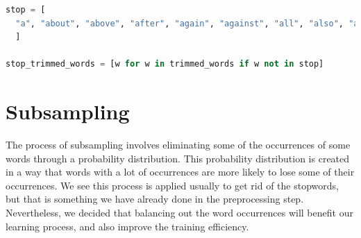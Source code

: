 \begin{lstlisting}[language=Python, caption=Stopword Removal]
stop = [
  "a", "about", "above", "after", "again", "against", "all", "also", "altough", "am", "an", "and", "any", "are", "aren't", "as", "at", "b", "be", "because", "been", "before", "being", "below", "between", "both", "but", "by", "c", "can", "can't", "cannot", "could", "couldn't", "d", "de", "did", "didn't", "do", "does", "doesn't", "doing", "don't", "down", "during", "e", "each", "either", "even", "f", "few", "for", "from", "further", "g", "h", "had", "hadn't", "has", "hasn't", "have", "haven't", "having", "he", "he'd", "he'll", "he's", "her", "here", "here's", "hers", "herself", "him", "himself", "his", "how", "how's", "however", "i", "i'd", "i'll", "i'm", "i've", "if", "ii", "in", "into", "is", "isn't", "it", "it's", "its", "itself", "j", "just", "k", "l", "like", "m", "many", "may", "me", "more", "most", "much", "must", "my", "myself", "n", "nd", "neither", "no", "nor", "not", "now", "o", "of", "off", "on", "once", "only", "or", "other", "our", "ours", "ourselves", "out", "over", "own", "p", "q", "r", "rd", "s", "same", "shall", "she", "she'd", "she'll", "she's", "should", "shouldn't", "so", "some", "such", "t", "th", "than", "that", "that's", "the", "their", "theirs", "them", "themselves", "then", "there", "there's", "these", "they", "they'd", "they'll", "they're", "they've", "this", "those", "though", "through", "to", "too", "u", "under", "until", "up", "us", "v", "very", "w", "was", "wasn't", "we", "we'd", "we'll", "we're", "we've", "were", "weren't", "what", "what's", "when", "when's", "where", "where's", "which", "while", "who", "who's", "whom", "why", "why's", "will", "with", "won't", "would", "wouldn't", "x", "y", "you", "you'd", "you'll", "you're", "you've", "your", "yours", "yourself", "yourselves", "z", "zero", "one", "two", "three", "four", "five", "six", "seven", "eight", "nine", "ten", "eleven", "twelve"
  ]

stop_trimmed_words = [w for w in trimmed_words if w not in stop]
\end{lstlisting}


\section{Subsampling}
\label{sec:subsampling}

The process of subsampling involves eliminating some of the occurrences of some words through a probability distribution. This probability distribution is created in a way that words with a lot of occurrences are more likely to lose some of their occurrences. We see this process is applied usually to get rid of the stopwords, but that is something we have already done in the preprocessing step. Nevertheless, we decided that balancing out the word occurrences will benefit our learning process, and also improve the training efficiency.

